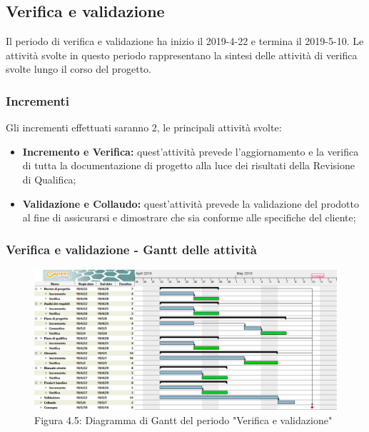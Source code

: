 \subsection{Verifica e validazione}
Il periodo di verifica e validazione ha inizio il 2019-4-22 e termina il 2019-5-10.
Le attività svolte in questo periodo rappresentano la sintesi delle attività di verifica svolte lungo il corso del progetto.

\subsubsection{Incrementi}
Gli incrementi effettuati saranno 2, le principali attività svolte:
\begin{itemize}

	\item \textbf{Incremento e Verifica:} quest'attività prevede l'aggiornamento e la verifica di tutta la documentazione di progetto alla luce dei risultati della Revisione di Qualifica;

	\item \textbf{Validazione e Collaudo:} quest'attività prevede la validazione del prodotto al fine di assicurarsi e dimostrare che sia conforme alle specifiche del cliente;

\end{itemize}
 
 \subsubsection{Verifica e validazione - Gantt delle attività}

\begin{figure} [H]
	\centering
	\includegraphics[scale=0.35]{Res/Gantt/Validazione}
	\caption{Figura 4.5: Diagramma di Gantt del periodo "Verifica e validazione"}\label{}
\end{figure}

 
\pagebreak
